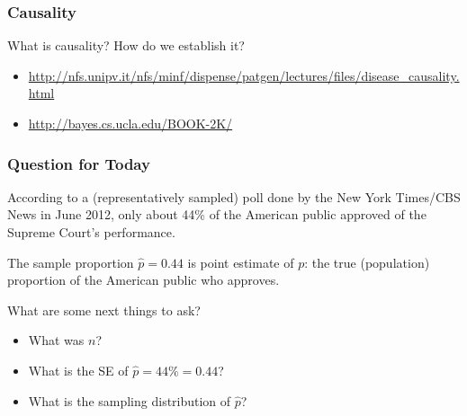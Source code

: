 \documentclass[handout]{beamer}
\newcommand{\blue}[1]{\textcolor{blue2}{#1}}
\newcommand{\phat}{\widehat{p}}
\begin{document}
\begin{frame}[fragile]
\frametitle{Causality}

What is causality?  How do we establish it?  

\begin{itemize}
\item \blue{\url{http://nfs.unipv.it/nfs/minf/dispense/patgen/lectures/files/disease_causality.html}}
\item \blue{\url{http://bayes.cs.ucla.edu/BOOK-2K/}}
\end{itemize}


\end{frame}







\begin{frame}[fragile]
\frametitle{Question for Today}

According to a (representatively sampled) poll done by the New York Times/CBS News in June 2012, only about 44\% of the American public approved of the Supreme Court's performance.  

\vspace{0.25cm}

\pause The sample proportion $\phat=0.44$ is \blue{point estimate} of $p$: the true (population) proportion of the American public who approves.  

\vspace{0.25cm}

\pause What are some next things to ask?

\vspace{0.25cm}

\pause\begin{itemize}
\item What was $n$?
\item What is the \blue{SE} of $\phat=44\%=0.44$?
\item What is the sampling distribution of $\phat$?
\end{itemize}

\end{frame}
\end{document}
